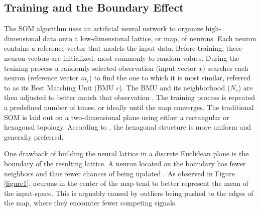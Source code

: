 \documentclass[10pt,titlepage]{article}
\begin{document}
\subsection{Training and the Boundary Effect}
The SOM algorithm uses an artificial neural network to organize high-dimensional
data onto a low-dimensional lattice, or map, of neurons.  Each neuron contains a
reference vector that models the input data.  Before training, these
neuron-vectors are initialized, most commonly to random values.  During the
training process a randomly selected observation (input vector $x$) searches
each neuron (reference vector $m_i$) to find the one to which it is most
similar, referred to as its Best Matching Unit (BMU $c$).  The BMU and its
neighborhood ($N_c$) are then adjusted to better match that observation
\citep{Kohonen2000}.  The training process is repeated a predefined number of
times, or ideally until the map converges.  The traditional SOM is laid out on a
two-dimensional plane using either a rectangular or hexagonal topology.
According to \cite{wu2006}, the hexagonal structure is more uniform and generally
preferred.

One drawback of building the neural lattice in a discrete Euclidean plane is the
boundary of the resulting lattice.  A neuron located on the boundary has fewer
neighbors and thus fewer chances of being updated \citep{wu2006}.  As observed
in Figure \ref{figure1}, neurons in the center of the map tend to better
represent the mean of the input-space.  This is arguably caused by outliers
being pushed to the edges of the map, where they encounter fewer competing
signals.
\end{document}
